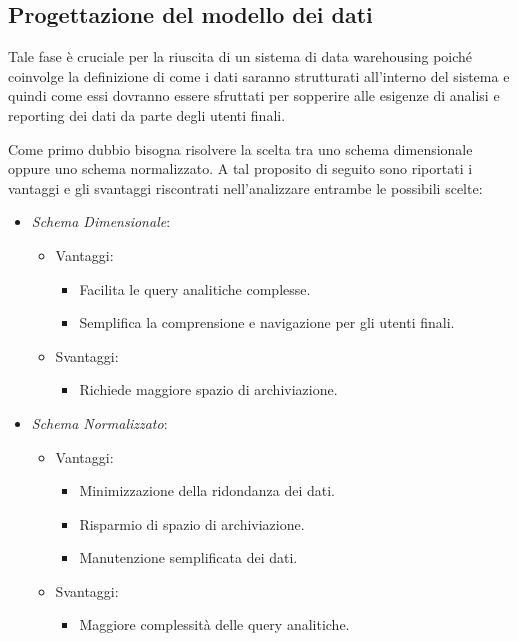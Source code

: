 \subsection{Progettazione del modello dei dati}

Tale fase è cruciale per la riuscita di un sistema di data warehousing poiché coinvolge la definizione di come i dati saranno strutturati all'interno del sistema e quindi come essi dovranno essere sfruttati per sopperire alle esigenze di analisi e reporting dei dati da parte degli utenti finali.

Come primo dubbio bisogna risolvere la scelta tra uno schema dimensionale oppure uno schema normalizzato. A tal proposito di seguito sono riportati i vantaggi e gli svantaggi riscontrati nell'analizzare entrambe le possibili scelte:

\begin{itemize}
    \item \textit{Schema Dimensionale}:
        \begin{itemize}
            \item Vantaggi:
                \begin{itemize}
                    \item Facilita le query analitiche complesse.
                    \item Semplifica la comprensione e navigazione per gli utenti finali.
                \end{itemize}
            \item Svantaggi:
                \begin{itemize}
                    \item Richiede maggiore spazio di archiviazione.
                \end{itemize}
        \end{itemize}
    \item \textit{Schema Normalizzato}:
            \begin{itemize}
            \item Vantaggi:
                \begin{itemize}
                    \item Minimizzazione della ridondanza dei dati.
                    \item Risparmio di spazio di archiviazione.
                    \item Manutenzione semplificata dei dati.
                \end{itemize}
            \item Svantaggi:
                \begin{itemize}
                    \item Maggiore complessità delle query analitiche.
                \end{itemize}
        \end{itemize}
\end{itemize}

